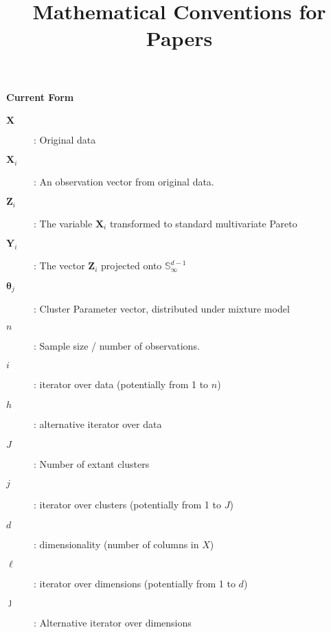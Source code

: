 \documentclass{article}
\title{Mathematical Conventions for Papers}
\date{}
\begin{document}
\maketitle

\paragraph{Current Form}
\begin{description}
\item[$\bm{X}$]: Original data
\item[$\bm{X}_i$]: An observation vector from original data.
\item[$\bm{Z}_i$]: The variable $\bm{X}_i$ transformed to standard multivariate Pareto
\item[$\bm{Y}_i$]: The vector $\bm{Z}_i$ projected onto ${\mathbb S}_{\infty}^{d-1}$
\item[$\bm{\theta}_j$]: Cluster Parameter vector, distributed under mixture model
\item[$n$]: Sample size / number of observations.
\item[$i$]: iterator over data (potentially from 1 to $n$)
\item[$h$]: alternative iterator over data
\item[$J$]: Number of extant clusters
\item[$j$]: iterator over clusters (potentially from 1 to $J$)
\item[$d$]: dimensionality (number of columns in $X$)
\item[$\ell$]: iterator over dimensions (potentially from 1 to $d$)
\item[$\jmath$]: Alternative iterator over dimensions
\end{description}
\end{document}
